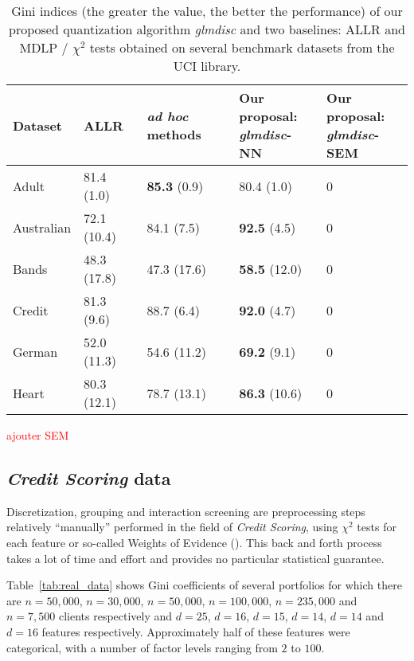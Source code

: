 \begin{table}
    \centering
        \caption{Gini indices (the greater the value, the better the performance) of our proposed quantization algorithm \textit{glmdisc} and two baselines: ALLR and MDLP / $\chi^2$ tests obtained on several benchmark datasets from the UCI library.}
    \label{tab:banchmark}
\begin{small}
\begin{tabular}{lllll}
Dataset & ALLR & \textit{ad hoc} methods & \makecell{Our proposal:\\ \textit{glmdisc}-NN} & \makecell{Our proposal:\\ \textit{glmdisc}-SEM} \\
\hline
Adult & 81.4 (1.0) & \textbf{85.3} (0.9) & 80.4 (1.0) & 0 \\
Australian & 72.1 (10.4) & 84.1 (7.5) & \textbf{92.5} (4.5) & 0 \\
Bands & 48.3 (17.8) & 47.3 (17.6) & \textbf{58.5} (12.0) & 0 \\
Credit & 81.3 (9.6) & 88.7 (6.4) & \textbf{92.0} (4.7) & 0 \\
German & 52.0 (11.3) & 54.6 (11.2) & \textbf{69.2} (9.1) & 0 \\
Heart & 80.3 (12.1) & 78.7 (13.1) & \textbf{86.3} (10.6) & 0 
\end{tabular}
\end{small}
\end{table}

\textcolor{red}{ajouter SEM}




\subsection{\textit{Credit Scoring} data} \label{subsec:exp_real}


Discretization, grouping and interaction screening are preprocessing steps relatively ``manually'' performed in the field of \textit{Credit Scoring}, using $\chi^2$ tests for each feature or so-called Weights of Evidence (\cite{zeng2014necessary}). This back and forth process takes a lot of time and effort and provides no particular statistical guarantee.

Table~\ref{tab:real_data} shows Gini coefficients of several portfolios for which there are $n=50,000$, $n=30,000$, $n=50,000$, $n=100,000$, $n=235,000$ and $n=7,500$ clients respectively and $d=25$, $d=16$, $d=15$, $d=14$, $d=14$ and $d=16$ features respectively. Approximately half of these features were categorical, with a number of factor levels ranging from $2$ to $100$. 

